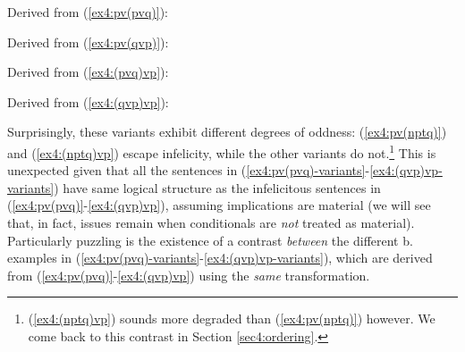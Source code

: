 \begin{exe}
	\ex Derived from (\ref{ex4:pv(pvq)}):
	\begin{xlist}
		\label{ex4:npt(pvq)}
		\label{ex4:pv(nptq)}
	\end{xlist}\label{ex4:pv(pvq)-variants}
	\ex Derived from (\ref{ex4:pv(qvp)}):
	\begin{xlist}
		\label{ex4:npt(qvp)}
		\label{ex4:pv(nqtp)}
	\end{xlist}\label{ex4:pv(qvp)-variants}
	\ex Derived from (\ref{ex4:(pvq)vp}):
	\begin{xlist}
		\label{ex4:n(pvq)tp}
		\label{ex4:(nptq)vp}
	\end{xlist}\label{ex4:(pvq)vp-variants}
	\ex Derived from (\ref{ex4:(qvp)vp}):
	\begin{xlist}
		\label{ex4:n(qvp)tp}
		\label{ex4:(nqtp)vp}
	\end{xlist}\label{ex4:(qvp)vp-variants}
\end{exe} 

Surprisingly, these variants exhibit different degrees of oddness: (\ref{ex4:pv(nptq)}) and (\ref{ex4:(nptq)vp}) escape infelicity, while the other variants do not.\footnote{(\ref{ex4:(nptq)vp}) sounds more degraded than (\ref{ex4:pv(nptq)}) however. We come back to this contrast in Section \ref{sec4:ordering}.} This is unexpected given that all the sentences in (\ref{ex4:pv(pvq)-variants}-\ref{ex4:(qvp)vp-variants}) have same logical structure as the infelicitous sentences in (\ref{ex4:pv(pvq)}-\ref{ex4:(qvp)vp}), assuming implications are material (we will see that, in fact, issues remain when conditionals are \textit{not} treated as material). Particularly puzzling is the existence of a contrast \textit{between} the different b. examples in (\ref{ex4:pv(pvq)-variants}-\ref{ex4:(qvp)vp-variants}), which are derived from (\ref{ex4:pv(pvq)}-\ref{ex4:(qvp)vp}) using the \textit{same} transformation.


